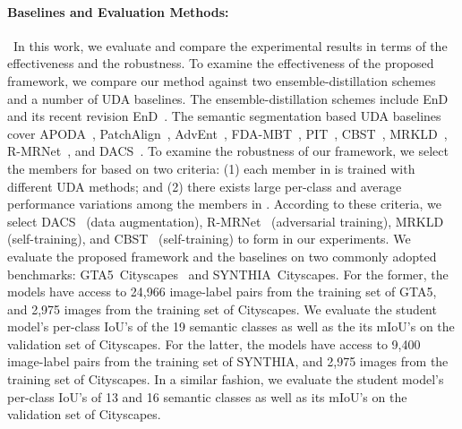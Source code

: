 \documentclass[final]{cvpr}
\begin{document}
\paragraph{Baselines and Evaluation Methods:}~In this work, we evaluate and compare the experimental results in terms of the effectiveness and the robustness. To examine the effectiveness of the proposed framework, we compare our method against two ensemble-distillation schemes and a number of UDA baselines. The ensemble-distillation schemes include EnD~\cite{hinton2015distilling} and its recent revision EnD~\cite{malinin2019ensemble}. The semantic segmentation based UDA baselines cover APODA~\cite{yang2020adversarial}, PatchAlign~\cite{tsai2019domain}, AdvEnt~\cite{vu2019advent}, FDA-MBT~\cite{yang2020fda}, PIT~\cite{lv2020cross}, CBST~\cite{zou2018unsupervised}, MRKLD~\cite{zou2019confidence}, R-MRNet~\cite{zheng2020rectifying}, and DACS~\cite{tranheden2020dacs}. To examine the robustness of our framework, we select the members for  based on two criteria: (1) each member in  is trained with different UDA methods; and (2) there exists large per-class and average performance variations among the members in . According to these criteria, we select DACS~\cite{tranheden2020dacs} (data augmentation), R-MRNet~\cite{zheng2020rectifying} (adversarial training), MRKLD~\cite{zou2019confidence} (self-training), and CBST~\cite{zou2018unsupervised} (self-training) to form  in our experiments. We evaluate the proposed framework and the baselines on two commonly adopted benchmarks: GTA5~\cite{richter2016playing}Cityscapes~\cite{Cordts2016Cityscapes} and SYNTHIA~\cite{ros2016synthia}Cityscapes. For the former, the models have access to 24,966 image-label pairs from the training set of GTA5, and 2,975 images from the training set of Cityscapes. We evaluate the student model's per-class IoU's of the 19 semantic classes as well as the its mIoU's on the validation set of Cityscapes. For the latter, the models have access to 9,400 image-label pairs from the training set of SYNTHIA, and 2,975 images from the training set of Cityscapes. In a similar fashion, we evaluate the student model's per-class IoU's of 13 and 16 semantic classes as well as its mIoU's on the validation set of Cityscapes.
\end{document}
